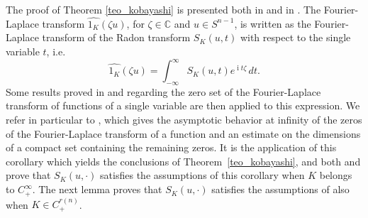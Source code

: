 \documentclass[a4paper]{amsart}
\theoremstyle{definition}
\numberwithin{equation}{section}
\begin{document}
The proof of Theorem \ref{teo_kobayashi} is presented  both in \cite[Theorem 2.3.6]{Kob1} and in \cite{Kob2}. 
The Fourier-Laplace transform ${\widehat{{{1_K}}}}({{\zeta}} u)$, for ${{\zeta}}\in{\mathbb{C}}$ and $u\in{S^{n-1}}$, is written as the Fourier-Laplace transform of the Radon transform $S_K(u,t)$ with respect to the single variable $t$, i.e.
\begin{equation}\label{radon_plus_fourier_oned}
{\widehat{{{1_K}}}}({{\zeta}} u)=\int_{-\infty}^{\infty}S_K(u,t)e^{{\operatorname{i}} t{{\zeta}}}\,dt.
\end{equation}
Some results proved in \cite{Kob2} and regarding the zero set of the Fourier-Laplace transform of functions of a single variable are then applied to this expression.
We refer in particular to \cite[Corollary 2.20]{Kob2}, which gives the asymptotic behavior at infinity of the zeros of the Fourier-Laplace transform of a function and an estimate on the dimensions of a compact set containing the remaining zeros.
It is the application of this corollary which yields the conclusions of Theorem~\ref{teo_kobayashi}, and both \cite[Lemma 3.14]{Kob2} and \cite[Lemma 2.2.8]{Kob1} prove that  $S_K(u,\cdot)$ satisfies the assumptions of this corollary when $K$ belongs to $C^\infty_+$.
The next lemma proves that $S_K(u,\cdot)$ satisfies the assumptions of \cite[Corollary 2.20]{Kob2} also when $K\in C^{{r(n)}}_+$. 
\end{document}
